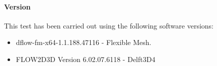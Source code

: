 \paragraph*{Version}
This test has been carried out using the following software versions:
\begin{itemize}
	
	\item[$\bullet$] dflow-fm-x64-1.1.188.47116 - Flexible Mesh. 
	\item[$\bullet$] FLOW2D3D Version 6.02.07.6118 - Delft3D4
	
\end{itemize}


